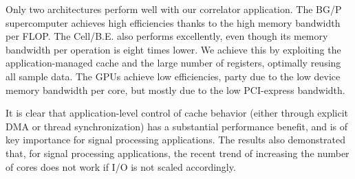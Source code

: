 \documentclass{article}
\begin{document}
Only two architectures perform well with our correlator application.  The BG/P
supercomputer achieves high efficiencies thanks to the high memory
bandwidth per FLOP.  The \mbox{Cell/B.E.} also performs excellently,
even though its memory bandwidth per operation is eight times lower.
We achieve this by exploiting the application-managed cache and the
large number of registers, optimally reusing all sample data.
The GPUs achieve low efficiencies, party due to the low device memory bandwidth per core,
but mostly due to the low PCI-express bandwidth.

It is clear that application-level control of cache behavior (either
through explicit DMA or thread synchronization) has a substantial
performance benefit, and is of key importance for signal processing
applications.  The results also demonstrated that, for signal
processing applications, the recent trend of increasing the number of
cores does not work if I/O is not scaled accordingly.





\end{document}
